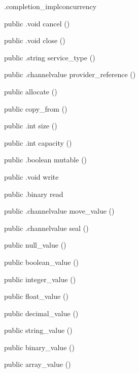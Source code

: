 \begin{CrexxClass}{.completion\_impl}{concurrency}
\begin{Members}
    \Method
      {public}
      {.void}
      {cancel}
      {()}

    \Method
      {public}
      {.void}
      {close}
      {()}

    \Method
      {public}
      {.string}
      {service\_type}
      {()}

    \Method
      {public}
      {.channelvalue}
      {provider\_reference}
      {()}

    \Factory
      {public}
      {allocate}
      {()}

    \Factory
      {public}
      {copy\_from}
      {()}

    \Method
      {public}
      {.int}
      {size}
      {()}

    \Method
      {public}
      {.int}
      {capacity}
      {()}

    \Method
      {public}
      {.boolean}
      {mutable}
      {()}

    \Method
      {public}
      {.void}
      {write}
      {}

    \Method
      {public}
      {.binary}
      {read}
      {}

    \Method
      {public}
      {.channelvalue}
      {move\_value}
      {()}

    \Method
      {public}
      {.channelvalue}
      {seal}
      {()}

    \Factory
      {public}
      {null\_value}
      {()}

    \Factory
      {public}
      {boolean\_value}
      {()}

    \Factory
      {public}
      {integer\_value}
      {()}

    \Factory
      {public}
      {float\_value}
      {()}

    \Factory
      {public}
      {decimal\_value}
      {()}

    \Factory
      {public}
      {string\_value}
      {()}

    \Factory
      {public}
      {binary\_value}
      {()}

    \Factory
      {public}
      {array\_value}
      {()}


\end{Members}
\end{CrexxClass}
